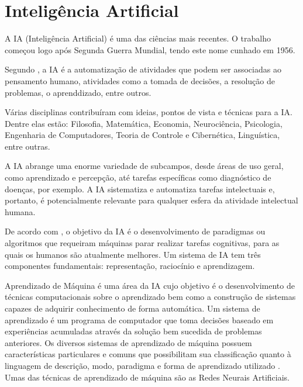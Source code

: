 \documentclass[
	12pt,				%
	openright,			%
	oneside,
	a4paper,			%
	english,			%
	french,				%
	spanish,			%
	brazil,				%
	]{abntex2}
\begin{document}
\section{Inteligência Artificial}
\label{sec:IA}
A IA (Inteligência Artificial) é uma das ciências mais recentes. O trabalho começou logo após Segunda Guerra Mundial, tendo este nome cunhado em 1956. \cite{russell2004inteligencia}

Segundo , a IA é a automatização de atividades que podem ser associadas ao pensamento humano, atividades como a tomada de decisões, a resolução de problemas, o aprenddizado, entre outros.

Várias disciplinas contribuíram com ideias, pontos de vista e técnicas para a IA. Dentre elas estão: Filosofia, Matemática, Economia, Neurociência, Psicologia, Engenharia de Computadores, Teoria de Controle e Cibernética, Linguística, entre outras. \cite{russell2004inteligencia}

A IA abrange uma enorme variedade de subcampos, desde áreas de uso geral, como aprendizado e percepção, até tarefas específicas como diagnóstico de doenças, por exemplo. A IA sistematiza e automatiza tarefas intelectuais e, portanto, é potencialmente relevante para qualquer esfera da atividade intelectual humana. \cite{russell2004inteligencia}

De acordo com , o objetivo da IA é o desenvolvimento de paradigmas ou algoritmos que requeiram máquinas parar realizar tarefas cognitivas, para as quais os humanos são atualmente melhores. Um sistema de IA tem três componentes fundamentais: representação, raciocínio e aprendizagem.

Aprendizado de Máquina é uma área da IA cujo objetivo é o desenvolvimento de técnicas computacionais sobre o aprendizado bem como a construção de sistemas capazes de adquirir conhecimento de forma automática. Um sistema de aprendizado é um programa de computador que toma decisões baseado em experiências acumuladas através da solução bem sucedida de problemas anteriores. Os diversos sistemas de aprendizado de máquina possuem características particulares e comuns que possibilitam sua classificação quanto à linguagem de descrição, modo, paradigma e forma de aprendizado utilizado \cite{monard2003sistemas}.
Umas das técnicas de aprendizado de máquina são as Redes Neurais Artificiais.

\end{document}
